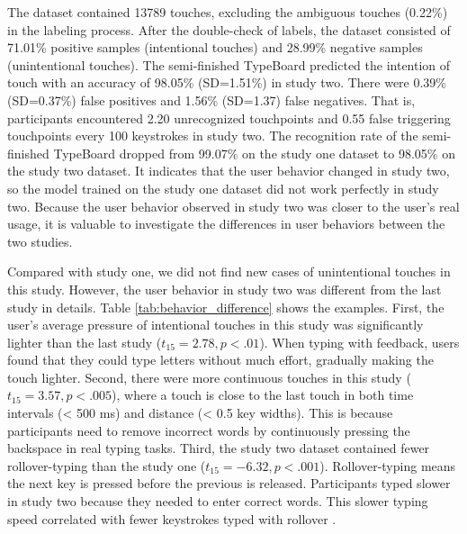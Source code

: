 The dataset contained 13789 touches, excluding the ambiguous touches (0.22\%) in the labeling process. After the double-check of labels, the dataset consisted of 71.01\% positive samples (intentional touches) and 28.99\% negative samples (unintentional touches). The semi-finished TypeBoard predicted the intention of touch with an accuracy of 98.05\% (SD=1.51\%) in study two. There were 0.39\% (SD=0.37\%) false positives and 1.56\% (SD=1.37) false negatives. That is, participants encountered 2.20 unrecognized touchpoints and 0.55 false triggering touchpoints every 100 keystrokes in study two.
The recognition rate of the semi-finished TypeBoard dropped from 99.07\% on the study one dataset to 98.05\% on the study two dataset. It indicates that the user behavior changed in study two, so the model trained on the study one dataset did not work perfectly in study two. Because the user behavior observed in study two was closer to the user’s real usage, it is valuable to investigate the differences in user behaviors between the two studies.


Compared with study one, we did not find new cases of unintentional touches in this study. However, the user behavior in study two was different from the last study in details. Table \ref{tab:behavior_difference} shows the examples. First, the user's average pressure of intentional touches in this study was significantly lighter than the last study ($t_{15}=2.78, p<.01$). When typing with feedback, users found that they could type letters without much effort, gradually making the touch lighter. Second, there were more continuous touches in this study ($t_{15}=3.57, p<.005$), where a touch is close to the last touch in both time intervals (< 500 ms) and distance (< 0.5 key widths). This is because participants need to remove incorrect words by continuously pressing the backspace in real typing tasks. Third, the study two dataset contained fewer rollover-typing than the study one ($t_{15}=-6.32, p<.001$). Rollover-typing means the next key is pressed before the previous is released. Participants typed slower in study two because they needed to enter correct words. This slower typing speed correlated with fewer keystrokes typed with rollover \cite{2018-Observations}.

